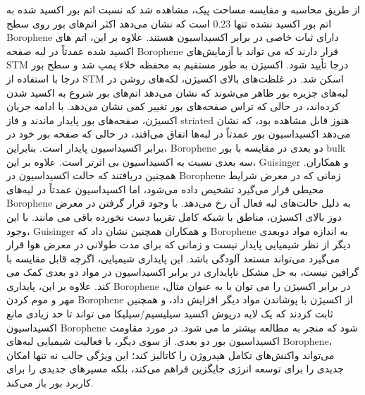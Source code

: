 از طریق محاسبه و مقایسه مساحت پیک، مشاهده شد که نسبت اتم بور اکسید شده به اتم بور اکسید نشده تنها 0.23 است که نشان می‌دهد اکثر اتم‌های بور روی سطح \gls{Borophene} دارای ثبات خاصی در برابر اکسیداسیون هستند. علاوه بر این، اتم های اکسید شده عمدتاً در لبه صفحه \gls{Borophene} قرار دارند که می تواند با آزمایش‌های \gls{STM} درجا تأیید شود. اکسیژن به طور مستقیم به محفظه خلاء پمپ شد و سطح بور درجا با استفاده از \gls{STM} اسکن شد. در غلظت‌های بالای اکسیژن، لکه‌های روشن در لبه‌های جزیره بور ظاهر می‌شوند که نشان می‌دهد اتم‌های بور شروع به اکسید شدن کرده‌اند، در حالی که تراس صفحه‌های بور تغییر کمی نشان می‌دهد. با ادامه جریان اکسیژن، صفحه‌های بور پایدار ماندند و فاز \gls{striated} هنوز قابل مشاهده بود، که نشان می‌دهد اکسیداسیون بور عمدتاً در لبه‌ها اتفاق می‌افتد، در حالی که صفحه بور خود در برابر اکسیداسیون پایدار است. بنابراین، \gls{Borophene} دو بعدی در مقایسه با بور \gls{bulk} سه بعدی نسبت به اکسیداسیون بی اثرتر است. علاوه بر این، \gls{Guisinger} و همکاران.\cite{mannixSynthesisBorophenesAnisotropic2015} همچنین دریافتند که حالت اکسیداسیون در \gls{Borophene} زمانی که در معرض شرایط محیطی قرار می‌گیرد تشخیص داده می‌شود، اما اکسیداسیون عمدتاً در لبه‌های \gls{Borophene} به دلیل حالت‌های لبه فعال آن رخ می‌دهد. با وجود قرار گرفتن در معرض دوز بالای اکسیژن، مناطق با شبکه کامل تقریبا دست نخورده باقی می مانند.\cite{zhaiObservationAllboronFullerene2014} با این وجود، \gls{Guisinger} و همکاران همچنین نشان داد که \gls{Borophene} به اندازه مواد دوبعدی دیگر از نظر شیمیایی پایدار نیست و زمانی که برای مدت طولانی در معرض هوا قرار می‌گیرد می‌تواند مستعد آلودگی باشد. این پایداری شیمیایی، اگرچه قابل مقایسه با گرافین نیست، به حل مشکل ناپایداری در برابر اکسیداسیون در مواد دو بعدی کمک می کند. علاوه بر این، پایداری \gls{Borophene} در برابر اکسیژن را می توان با به عنوان مثال، مهر و موم کردن \gls{Borophene} از اکسیژن با پوشاندن مواد دیگر افزایش داد، و همچنین ثابت کردند که یک لایه درپوش اکسید سیلیسیم/سیلیکا می تواند تا حد زیادی مانع اکسیداسیون \gls{Borophene} شود که منجر به مطالعه بیشتر ما می شود. در مورد مقاومت اکسیداسیون بور دو بعدی.\cite{zhangTwodimensionalBoronStructures2017} از سوی دیگر، با فعالیت شیمیایی لبه‌های \gls{Borophene}، می‌تواند واکنش‌های تکامل هیدروژن را کاتالیز کند؛ \cite{zhangTwoDimensionalBoronMonolayers2015} این ویژگی جالب نه تنها امکان جدیدی را برای توسعه انرژی جایگزین فراهم می‌کند، بلکه مسیرهای جدیدی را برای کاربرد بور باز می‌کند.

